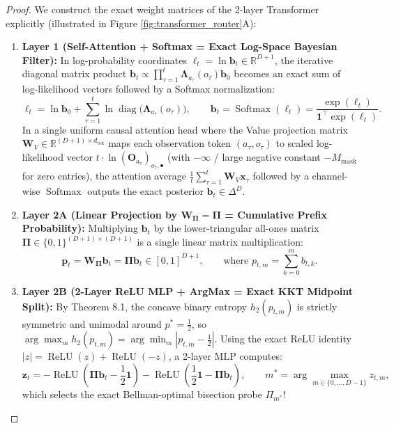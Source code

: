\documentclass[11pt,a4paper]{article}
\theoremstyle{definition}
\theoremstyle{remark}
\begin{document}
\begin{proof}
We construct the exact weight matrices of the 2-layer Transformer explicitly (illustrated in Figure \ref{fig:transformer_router}A):
\begin{enumerate}
    \item \textbf{Layer 1 (Self-Attention + Softmax = Exact Log-Space Bayesian Filter):}
    In log-probability coordinates $\bm{\ell}_t = \ln \bm{b}_t \in \mathbb{R}^{D+1}$, the iterative diagonal matrix product $\bm{b}_t \propto \prod_{\tau=1}^{t} \mathbf{\Lambda}_{a_\tau}(o_\tau) \bm{b}_0$ becomes an exact sum of log-likelihood vectors followed by a Softmax normalization:
    \begin{equation}
        \bm{\ell}_t = \ln \bm{b}_0 + \sum_{\tau=1}^{t} \ln \operatorname{diag}\big(\mathbf{\Lambda}_{a_\tau}(o_\tau)\big), \qquad \bm{b}_t = \operatorname{Softmax}(\bm{\ell}_t) = \frac{\exp(\bm{\ell}_t)}{\bm{1}^\top \exp(\bm{\ell}_t)}.
    \end{equation}
    In a single uniform causal attention head where the Value projection matrix $\mathbf{W}_V \in \mathbb{R}^{(D+1)\times d_{\text{tok}}}$ maps each observation token $(a_\tau, o_\tau)$ to scaled log-likelihood vector $t \cdot \ln (\mathbf{O}_{a_\tau})_{o_\tau, \bullet}$ (with $-\infty$ / large negative constant $-M_{\text{mask}}$ for zero entries), the attention average $\frac{1}{t}\sum_{\tau=1}^{t} \mathbf{W}_V \bm{x}_\tau$ followed by a channel-wise $\operatorname{Softmax}$ outputs the exact posterior $\bm{b}_t \in \Delta^D$.

    \item \textbf{Layer 2A (Linear Projection by $\mathbf{W}_{\mathbf{\Pi}} = \mathbf{\Pi}$ = Cumulative Prefix Probability):}
    Multiplying $\bm{b}_t$ by the lower-triangular all-ones matrix $\mathbf{\Pi} \in \{0,1\}^{(D+1)\times(D+1)}$ is a single linear matrix multiplication:
    \begin{equation}
        \bm{p}_t = \mathbf{W}_{\mathbf{\Pi}} \bm{b}_t = \mathbf{\Pi} \bm{b}_t \in [0, 1]^{D+1}, \qquad \text{where } p_{t,m} = \sum_{k=0}^{m} b_{t,k}.
    \end{equation}

    \item \textbf{Layer 2B (2-Layer ReLU MLP + ArgMax = Exact KKT Midpoint Split):}
    By Theorem 8.1, the concave binary entropy $h_2(p_{t,m})$ is strictly symmetric and unimodal around $p^* = \frac{1}{2}$, so $\arg\max_m h_2(p_{t,m}) = \arg\min_m |p_{t,m} - \frac{1}{2}|$. Using the exact ReLU identity $|z| = \operatorname{ReLU}(z) + \operatorname{ReLU}(-z)$, a 2-layer MLP computes:
    \begin{equation}
        \bm{z}_t = -\operatorname{ReLU}\left(\mathbf{\Pi}\bm{b}_t - \frac{1}{2}\bm{1}\right) - \operatorname{ReLU}\left(\frac{1}{2}\bm{1} - \mathbf{\Pi}\bm{b}_t\right), \qquad m^* = \arg\max_{m \in \{0,\dots,D-1\}} z_{t,m},
    \end{equation}
    which selects the exact Bellman-optimal bisection probe $\Pi_{m^*}$!
\end{enumerate}
\end{proof}
\end{document}
